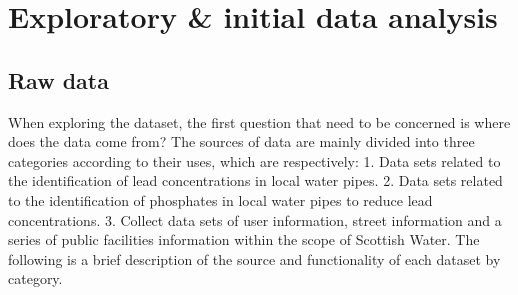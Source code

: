 \documentclass[11pt,twoside]{article}
\numberwithin{Theorem}{section}
\numberwithin{Definition}{section}
\numberwithin{Lemma}{section}
\numberwithin{Algorithm}{section}
\numberwithin{equation}{section}
\begin{document}
\clearpage

\section{Exploratory \& initial data analysis}
\label{sec.explore}

\subsection{Raw data}
\label{sec:raw}
When exploring the dataset, the first question that need to be concerned is where does the data come from? The sources of data are mainly divided into three categories according to their uses, which are respectively: 1. Data sets related to the identification of lead concentrations in local water pipes. 2. Data sets related to the identification of phosphates in local water pipes to reduce lead concentrations. 3. Collect data sets of user information, street information and a series of public facilities information within the scope of Scottish Water. The following is a brief description of the source and functionality of each dataset by category.
\end{document}

